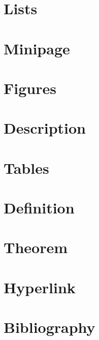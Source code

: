 
\section{Lists}
    

\section{Minipage}
    

\section{Figures}
    

\section{Description}
    

\section{Tables}
    

\section{Definition}
    

\section{Theorem}
    

\section{Hyperlink}
    

\section{Bibliography}
    
